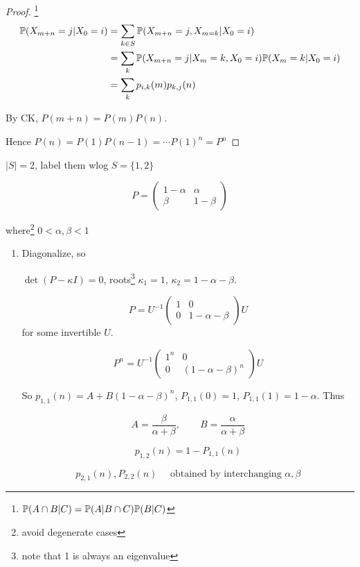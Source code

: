 \documentclass[a4paper]{article}
\begin{document}
\begin{proof} \footnote{ $ \P(A \cap B | C)  = \P(A | B \cap C) \P(B | C)$ }
	\begin{align*}
	\P (X_{m + n} = j | X_{0} = i) & =  \sum_{k \in S} \P (X_{m + n} = j, X_{m = k} | X_{0} = i) \\
	& = \sum_{k} \P (X_{m + n} = j | X_{m} = k, X_{0} = i) \P( X_{m} = k  | X_{0} = i) \\
	& = \sum_{k}p_{i,k} (m) p_{k,j}(n) 
	\end{align*}
	
	By CK, $ P(m+n) = P(m) P(n) $.

	Hence $ P(n) = P(1)P(n-1) = \cdots P(1)^{n} = P^{n} $
\end{proof}


\begin{eg}
	$ | S | = 2 $, label them wlog $ S = \{ 1,2 \} $
	
	\[ P = \begin{pmatrix}
	1 - \alpha & \alpha \\
	\beta & 1 - \beta 
	\end{pmatrix} \]
	
	where\footnote{avoid degenerate cases} $ 0 < \alpha , \beta < 1 $ 
	
\begin{enumerate}
	\item 	Diagonalize, so
	
	$ \det ( P - \kappa I )= 0 $, roots\footnote{note that 1 is always an eigenvalue} $ \kappa_{1} = 1 $, $ \kappa_{2} = 1 - \alpha - \beta $.
	
	\[ P = U^{-1} \begin{pmatrix}
	1 & 0 \\
	0 & 1 - \alpha - \beta
	\end{pmatrix} U \] for some invertible $ U $.
	
	
	\[ P^{n} = U^{-1} \begin{pmatrix}
	1^{n} & 0 \\
	0 & (1 - \alpha - \beta)^{n}
	\end{pmatrix} U \]
	
	So $ p_{1,1}(n) = A + B(1 - \alpha - \beta)^{n} $, $ P_{1,1}(0) = 1 $, $ P_{1,1}(1) = 1 - \alpha $. Thus
	
	\[ A = \frac{\beta}{\alpha + \beta}, \qquad B = \frac{\alpha}{\alpha + \beta} \]
	
	\[ p_{1,2}(n) = 1 - P_{1,1}(n) \]
	
	\[ p_{2,1}(n),P_{2,2}(n) \quad \text{ obtained by interchanging } \alpha, \beta  \]
	

\end{enumerate}
\end{eg}
\end{document}

